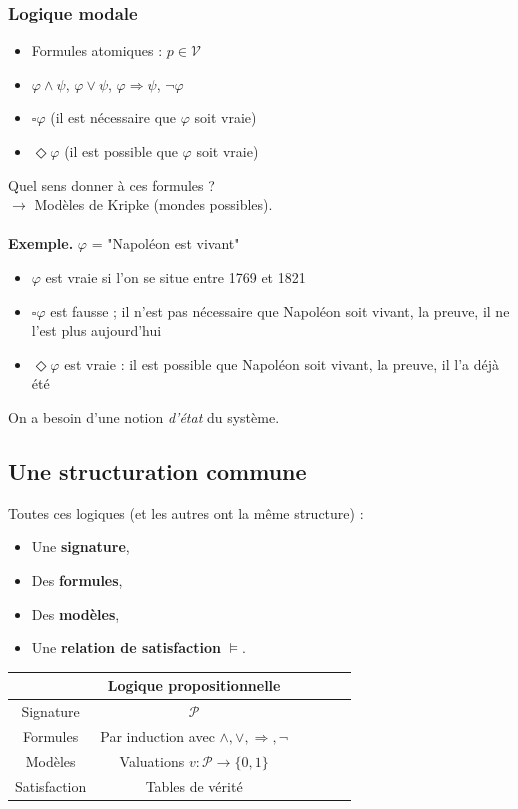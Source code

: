 \documentclass{beamer}
\newcommand{\itemz}{\item[$\triangleright$]}
\begin{document}
\begin{frame}
\frametitle{Logique modale}
\begin{itemize}
\itemz Formules atomiques : $p \in \mathcal{V}$ \pause
\itemz $\varphi \wedge \psi$, $\varphi \vee \psi$, $\varphi \Rightarrow \psi$, $\neg \varphi$ \pause
\itemz $\square \varphi$ (il est nécessaire que $\varphi$ soit vraie) \pause
\itemz $\Diamond \varphi$ (il est possible que $\varphi$ soit vraie) \pause
\end{itemize}
\pause
Quel sens donner à ces formules ? \pause \\ $\longrightarrow$ Modèles de Kripke (mondes possibles). \pause \\~\\
\textbf{Exemple.} $\varphi$ = "Napoléon est vivant" \pause
\begin{itemize}
\itemz $\varphi$ \pause est vraie si l'on se situe entre 1769 et 1821 \pause
\itemz $\square \varphi$ \pause est fausse ; il n'est pas nécessaire que Napoléon soit vivant, la preuve, il ne l'est plus aujourd'hui \pause
\itemz $\Diamond \varphi$ \pause est vraie : il est possible que Napoléon soit vivant, la preuve, il l'a déjà été \pause
\end{itemize}
On a besoin d'une notion \textit{d'état} du système.

\end{frame}

\subsection{Une structuration commune}

\begin{frame}
Toutes ces logiques (et les autres ont la même structure) :
\begin{itemize}
\itemz Une \textbf{signature},
\itemz Des \textbf{formules},
\itemz Des \textbf{modèles},
\itemz Une \textbf{relation de satisfaction} $\models$.
\end{itemize}
\pause
\begin{center}
\begin{tabular}{|c|c|c|c|c|c|}
  \hline
  & Logique propositionnelle \\
  \hline
  Signature & $\mathcal{P}$  \\ 
  Formules & Par induction avec $\wedge,\vee,\Rightarrow,\neg$ \\
  Modèles & Valuations $v : \mathcal{P} \to \{ 0 , 1 \}$  \\
  Satisfaction & Tables de vérité \\
  \hline
\end{tabular}
\end{center}
\end{frame}
\end{document}
